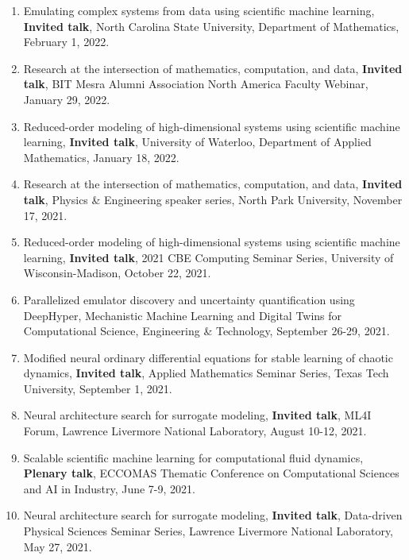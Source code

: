 \documentclass[letterpaper]{article}
\begin{document}
\begin{enumerate}
\item Emulating complex systems from data using scientific machine learning, \textbf{Invited talk}, North Carolina State University, Department of Mathematics, February 1, 2022.

\item Research at the intersection of mathematics, computation, and data, \textbf{Invited talk}, BIT Mesra Alumni Association North America Faculty Webinar, January 29, 2022.

\item Reduced-order modeling of high-dimensional systems using scientific machine learning, \textbf{Invited talk}, University of Waterloo, Department of Applied Mathematics, January 18, 2022.

\item Research at the intersection of mathematics, computation, and data, \textbf{Invited talk}, Physics \& Engineering speaker series, North Park University, November 17, 2021.

\item Reduced-order modeling of high-dimensional systems using scientific machine learning, \textbf{Invited talk}, 2021 CBE Computing Seminar Series, University of Wisconsin-Madison, October 22, 2021.

\item Parallelized emulator discovery and uncertainty quantification using DeepHyper, Mechanistic Machine Learning and Digital Twins for Computational Science, Engineering \& Technology, September 26-29, 2021.

\item Modified neural ordinary differential equations for stable learning of chaotic dynamics, \textbf{Invited talk}, Applied Mathematics Seminar Series, Texas Tech University, September 1, 2021.

\item Neural architecture search for surrogate modeling, \textbf{Invited talk}, ML4I Forum, Lawrence Livermore National Laboratory, August 10-12, 2021.

\item Scalable scientific machine learning for computational fluid dynamics, \textbf{Plenary talk}, ECCOMAS Thematic Conference on Computational Sciences and AI in Industry, June 7-9, 2021.

\item Neural architecture search for surrogate modeling, \textbf{Invited talk}, Data-driven Physical Sciences Seminar Series, Lawrence Livermore National Laboratory, May 27, 2021.


\end{enumerate}
\end{document}
